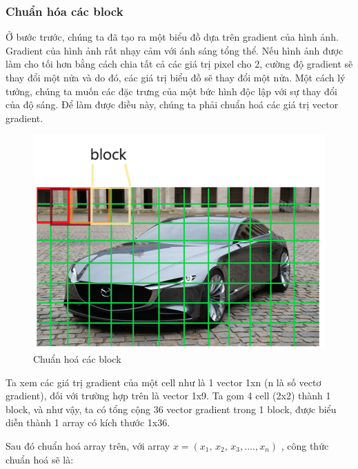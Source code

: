 \documentclass[10pt,conference,a4paper]{IEEEtran}
\makeatletter
\def\ScaleIfNeeded{\ifdim\Gin@nat@width>\linewidth\linewidth\else\Gin@nat@width\fi}
\makeatother
\begin{document}
\subsubsection{Chuẩn hóa các block}


Ở bước trước, chúng ta đã tạo ra một biểu đồ dựa trên gradient của hình ảnh. Gradient của hình ảnh rất nhạy cảm với ánh sáng tổng thể. Nếu hình ảnh được làm cho tối hơn bằng cách chia tất cả các giá trị pixel cho 2, cường độ gradient sẽ thay đổi một nửa và do đó, các giá trị biểu đồ sẽ thay đổi một nửa. Một cách lý tưởng, chúng ta muốn các đặc trưng của một bức hình độc lập với sự thay đổi của độ sáng. Để làm được điều này, chúng ta phải chuẩn hoá các giá trị vector gradient.

\begin{figure}[ht]
	\centering
	\includegraphics[width=\ScaleIfNeeded]{"normalize block"}
	\caption{Chuẩn hoá các block}
	\label{fig:normalize-block}
\end{figure}

Ta xem các giá trị gradient của một cell như là 1 vector 1xn (n là số vectơ gradient), đối với trường hợp trên là vector 1x9. Ta gom 4 cell (2x2) thành 1 block, và như vậy, ta có tổng cộng 36 vector gradient trong 1 block, được biểu diễn thành 1 array có kích thước 1x36.

Sau đó chuẩn hoá array trên, với array  $x = \left( {{x_1},\,{x_2},\,{x_3},....,{x_n}} \right)$ , công thức chuẩn hoá sẽ là:
\end{document}
